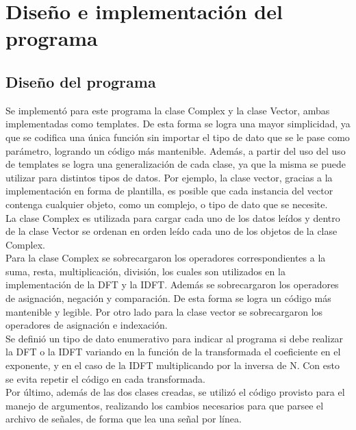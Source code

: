 \documentclass[12pt,a4paper]{report}
\begin{document}
	\section{Diseño e implementación del programa}	
	
        \subsection{Diseño del programa}
            \indent Se implementó para este programa la clase Complex y la clase Vector, ambas implementadas como templates.
            De esta forma se logra una mayor simplicidad, ya que se codifica una única función sin importar el tipo de dato que
            se le pase como parámetro, logrando un código más mantenible. Además, a partir del uso del uso de templates se logra una
            generalización de cada clase, ya que la misma se puede utilizar para distintos tipos de datos. Por ejemplo, la clase vector,
            gracias a la implementación en forma de plantilla, es posible que cada instancia del vector contenga cualquier objeto, como
            un complejo, o tipo de dato que se necesite. 
            \\
            \indent La clase Complex es utilizada para cargar cada uno de los datos leídos y dentro de la clase Vector se ordenan en
            orden leído cada uno de los objetos de la clase Complex. 
   			\\
			\indent Para la clase Complex se sobrecargaron los operadores correspondientes a la suma, resta, multiplicación, 
			división, los cuales son utilizados en la implementación de la DFT y la IDFT. Además se sobrecargaron los operadores
			de asignación, negación y comparación. De esta forma se logra un código más mantenible y legible. Por otro lado para 
			la clase vector se sobrecargaron los operadores de asignación e indexación. 
            \\
            \indent Se definió un tipo de dato enumerativo para indicar al programa si debe realizar la DFT o la IDFT variando en
			la función de la transformada el coeficiente en el exponente, y en el caso de la IDFT multiplicando por la inversa
			de N. Con esto se evita repetir el código en cada transformada.
			\\
			\indent Por último, además de las dos clases creadas, se utilizó el código provisto para el manejo de argumentos,
			realizando los cambios necesarios para que parsee el archivo de señales, de forma que lea una señal por línea.
\end{document}
